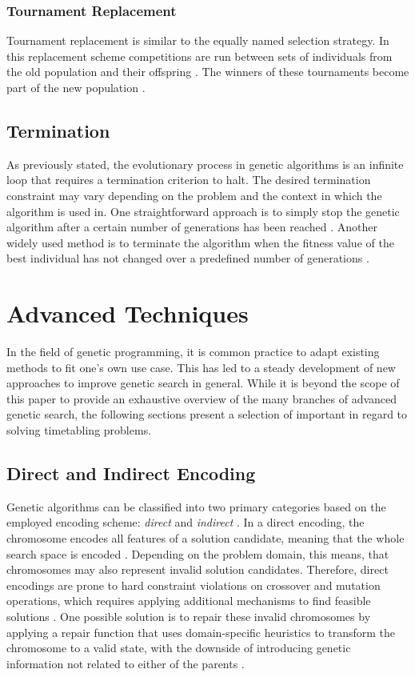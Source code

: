 \documentclass[sigconf]{acmart}
\begin{document}
\subsubsection{Tournament Replacement}
Tournament replacement is similar to the equally named selection strategy.
In this replacement scheme competitions are run between sets of individuals
from the old population and their offspring \cite{Affenzeller2009}.
The winners of these tournaments become part of the new population
\cite{Affenzeller2009}.


\subsection{Termination}
As previously stated, the evolutionary process in genetic algorithms is
an infinite loop that requires a termination criterion to halt.
The desired termination constraint may vary depending on the problem and the
context in which the algorithm is used in.
One straightforward approach is to simply stop the genetic algorithm after a
certain number of generations has been reached \cite{Beligiannis2009}.
Another widely used method is to terminate the algorithm when the fitness value
of the best individual has not changed over a predefined number of
generations \cite{Carr2014}.


\section{Advanced Techniques}
In the field of genetic programming, it is common practice to adapt existing
methods to fit one's own use case. This has led to a steady development of new
approaches to improve genetic search in general.
While it is beyond the scope of this paper to provide an exhaustive overview
of the many branches of advanced genetic search,
the following sections present a selection of important in regard to solving
timetabling problems.

\subsection{Direct and Indirect Encoding}
Genetic algorithms can be classified into two primary categories based on the
employed encoding scheme: \textit{direct} and \textit{indirect}
\cite{Thanh2007}.
In a direct encoding, the chromosome encodes all features of a solution
candidate, meaning that the whole search space is encoded
\cite{Thanh2007,Goos2002}.
Depending on the problem domain, this means, that chromosomes may also
represent invalid solution candidates. Therefore, direct encodings are prone
to hard constraint violations on crossover and mutation operations, which
requires applying additional mechanisms to find feasible solutions
\cite{Goos2002}.
One possible solution is to repair these invalid
chromosomes by applying a repair function that uses domain-specific
heuristics to transform the chromosome to a valid state, with the downside of
introducing genetic information not related to either of the parents
\cite{Beligiannis2009,Affenzeller2009}.
\end{document}
